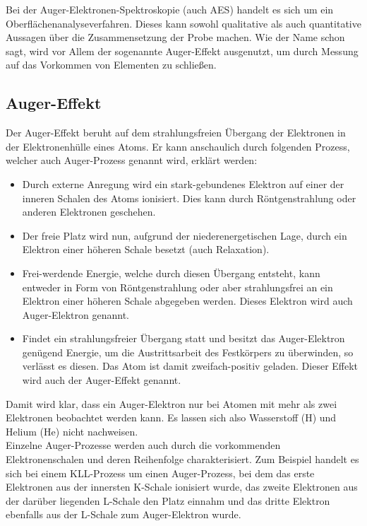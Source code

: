 	Bei der Auger-Elektronen-Spektroskopie (auch AES) handelt es sich um ein Oberflächenanalyseverfahren.
	Dieses kann sowohl qualitative als auch quantitative Aussagen über die Zusammensetzung der Probe machen. 
	Wie der Name schon sagt, wird vor Allem der sogenannte Auger-Effekt ausgenutzt, um durch Messung auf das Vorkommen von Elementen zu schließen.

\subsection{Auger-Effekt} %
\label{sub:auger_effekt}

	Der Auger-Effekt beruht auf dem strahlungsfreien Übergang der Elektronen in der Elektronenhülle eines Atoms.
	Er kann anschaulich durch folgenden Prozess, welcher auch Auger-Prozess genannt wird, erklärt werden:
	
	\begin{itemize}
		\item
			Durch externe Anregung wird ein stark-gebundenes Elektron auf einer der inneren Schalen des Atoms ionisiert.
			Dies kann durch Röntgenstrahlung oder anderen Elektronen geschehen.
		\item
			Der freie Platz wird nun, aufgrund der niederenergetischen Lage, durch ein Elektron einer höheren Schale besetzt (auch Relaxation).
		\item
			Frei-werdende Energie, welche durch diesen Übergang entsteht, kann entweder in Form von Röntgenstrahlung oder aber strahlungsfrei an ein Elektron einer höheren Schale abgegeben werden.
			Dieses Elektron wird auch Auger-Elektron genannt.
		\item
			Findet ein strahlungsfreier Übergang statt und besitzt das Auger-Elektron genügend Energie, um die Austrittsarbeit des Festkörpers zu überwinden, so verlässt es diesen.
			Das Atom ist damit zweifach-positiv geladen. 
			Dieser Effekt wird auch der Auger-Effekt genannt.
	\end{itemize}

	Damit wird klar, dass ein Auger-Elektron nur bei Atomen mit mehr als zwei Elektronen beobachtet werden kann. 
	Es lassen sich also Wasserstoff (H) und Helium (He) nicht nachweisen. \cite{description}\\

	Einzelne Auger-Prozesse werden auch durch die vorkommenden Elektronenschalen und deren Reihenfolge charakterisiert.
	Zum Beispiel handelt es sich bei einem KLL-Prozess um einen Auger-Prozess, bei dem das erste Elektronen aus der innersten K-Schale ionisiert wurde, 
	das zweite Elektronen aus der darüber liegenden L-Schale den Platz einnahm und das dritte Elektron ebenfalls aus der L-Schale zum Auger-Elektron wurde.

